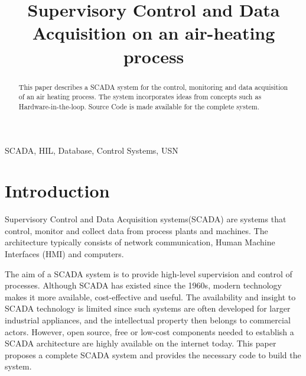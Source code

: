 \documentclass[conference]{IEEEtran}
\begin{document}



\title{Supervisory Control and Data Acquisition on an air-heating process \\
{\footnotesize}
}

\author{
}

\maketitle


\begin{abstract}
This paper describes a SCADA system for the control, monitoring and data acquisition of an air heating process. The system incorporates ideas from concepts such as Hardware-in-the-loop. Source Code is made available for the complete system.
\end{abstract}

\begin{IEEEkeywords}
SCADA, HIL, Database, Control Systems, USN
\end{IEEEkeywords}

\section{Introduction}
Supervisory Control and Data Acquisition systems(SCADA) are systems that control, monitor and collect data from process plants and machines. The architecture typically consists of network communication, Human Machine Interfaces (HMI) and computers\cite{wikipediacontributors_2022_scada}.

The aim of a SCADA system is to provide high-level supervision and control of processes. Although SCADA has existed since the 1960s\cite{yang_2019_ict}, modern technology makes it more available, cost-effective and useful. The availability and insight to SCADA technology is limited since such systems are often developed for larger industrial appliances, and the intellectual property then belongs to commercial actors. However, open source, free or low-cost components needed to establish a SCADA architecture are highly available on the internet today. This paper proposes a complete SCADA system and provides the necessary code to build the system.
\end{document}
